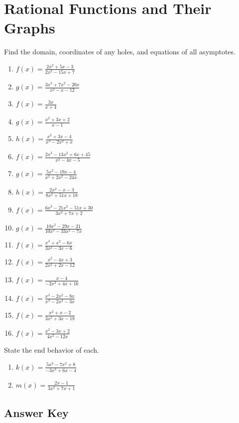 \chapter{Rational Functions and Their Graphs}

Find the domain, coordinates of any holes, and equations of all asymptotes.
\begin{multicols}{2}
\begin{enumerate}
\setlength\itemsep{10pt}
	\item $f(x) = \frac{2x^2+5x-3}{2x^2-15x+7}$
	\item $g(x) = \frac{3x^3+7x^2-20x}{x^2-x-12}$
	\item $f(x) = \frac{3x}{x+4}$
	\item $g(x) = \frac{x^2+3x+2}{x-1}$
	\item $h(x) = \frac{x^2+3x-4}{x^3-2x^2+x}$
	\item $f(x) = \frac{2x^3-13x^2+6x+45}{x^2-4x-5}$
	\item $g(x) = \frac{5x^2-19x-4}{x^3+2x^2-24x}$
	\item $h(x) = \frac{2x^2-x-3}{8x^2+51x+18}$
	\item $f(x) = \frac{6x^3 - 21x^2 - 51x + 30}{3x^2+7x+2}$
	\item $g(x) = \frac{10x^2-29x-21}{10x^3-33x^2-7x}$
	\item $f(x) = \frac{x^3+x^2-6x}{3x^2-3x-6}$
	\item $f(x) = \frac{x^2-4x+3}{2x^2+2x-12}$
	\item $f(x) = \frac{x-4}{-2x^2+4x+16}$
	\item $f(x) = \frac{x^3-2x^2-8x}{x^3-2x^2-3x}$
	\item $f(x) = \frac{x^2+x-2}{3x^2+3x-18}$
	\item $f(x) = \frac{x^2-3x+2}{4x^2-12x}$
\end{enumerate}	\setcounter{Review}{\value{enumi}}
\end{multicols}
\vspace{0.25in}

State the end behavior of each.
\begin{enumerate}	\setcounter{enumi}{\value{Review}}
	\item $k(x) = \frac{5x^3-7x^2+8}{-3x^3+6x-4}$
	\item $m(x) = \frac{2x-1}{3x^2+7x+1}$
\end{enumerate}

\newpage

\section{Answer Key}

